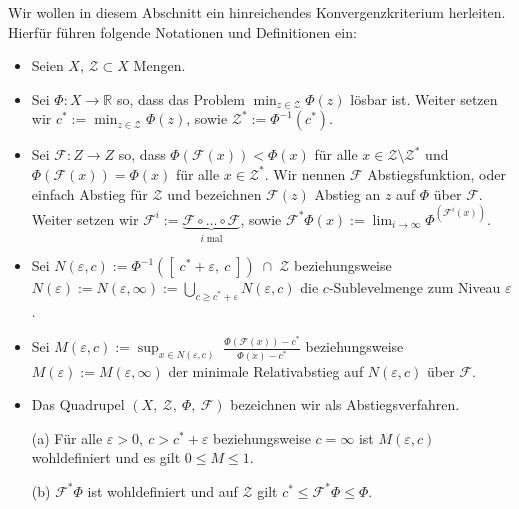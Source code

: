 Wir wollen in diesem Abschnitt ein hinreichendes Konvergenzkriterium herleiten. Hierfür führen folgende Notationen und Definitionen ein:
\begin{itemize}
\item Seien $X$, $\mathcal{Z} \subset X$ Mengen.
\item Sei $\Phi : X \rightarrow \mathbb{R}$ so, dass das Problem 
$
	\min_{z \in \mathcal{Z}} \Phi(z)
$
lösbar ist. Weiter setzen wir $c^* := \min_{z \in \mathcal{Z}} \Phi(z)$, sowie $\mathcal{Z^*} := \Phi^{-1}(c^*)$.

\item Sei $\mathcal{F} : Z \rightarrow Z$ so, dass $\Phi(\mathcal{F}(x)) < \Phi(x)$ für alle $x \in \mathcal{Z} \setminus \mathcal{Z^*}$ und $\Phi(\mathcal{F}(x)) = \Phi(x)$ für alle $x \in \mathcal{Z}^*$. Wir nennen $\mathcal{F}$ Abstiegsfunktion, oder einfach Abstieg für $\mathcal{Z}$ und bezeichnen $\mathcal{F}(z)$ Abstieg an $z$ auf $\Phi$ über $\mathcal{F}$. Weiter setzen wir $\mathcal{F}^i := 
\underbrace{\mathcal{F} \circ ... \circ \mathcal{F}}_{i \; \text{mal}}$, sowie $\mathcal{F}^* \Phi(x) := \lim_{i \rightarrow \infty}\Phi^(\mathcal{F}^i(x))$.

\item Sei $N(\varepsilon, c) := \Phi^{-1}([ \; c^* + \varepsilon,\ c \; ]) \; \cap \; \mathcal{Z}$ beziehungsweise
$
N(\varepsilon) := N(\varepsilon, \infty) := 
\bigcup\limits_{c \geq c^*+\varepsilon} N(\varepsilon,c) $  
die $c$-Sublevelmenge zum Niveau $\varepsilon$.

\item Sei 
$
M(\varepsilon,c) := 
\sup_{x \in N(\varepsilon,c)} \; \frac{\Phi(\mathcal{F}(x)) - c^*}{\Phi(x)-c^*}
$
beziehungsweise $M(\varepsilon) := M(\varepsilon, \infty)$
der minimale Relativabstieg auf $N(\varepsilon,c)$ über $\mathcal{F}$.

\item Das Quadrupel $(X ,\ \mathcal{Z} ,\ \Phi ,\ \mathcal{F})$ bezeichnen wir als Abstiegsverfahren.


\end{itemize}

\begin{bemerkung}
\begin{itemize}
\item[(a)] Für alle $\varepsilon > 0, \ c > c^* + \varepsilon$ beziehungsweise $c = \infty$ ist $M(\varepsilon, c)$ wohldefiniert und es gilt $0 \leq M \leq 1$.
\item[(b)] $\mathcal{F}^* \Phi$ ist wohldefiniert und auf $\mathcal{Z}$ gilt $c^* \leq \mathcal{F}^* \Phi \leq \Phi$.
\end{itemize}	
\end{bemerkung}

